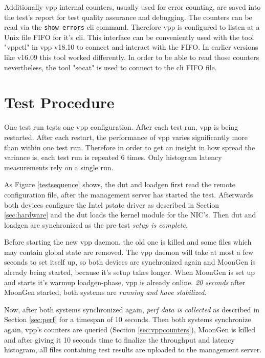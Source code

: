 Additionally \Ac{vpp} internal counters, usually used for error
counting, are saved into the test's report for test quality assurance
and debugging. The counters can be read via the \lstinline|show errors| 
\Ac{cli} command. Therefore \Ac{vpp} is configured to listen
at a Unix file FIFO for it's \Ac{cli}. This interface can be
conveniently used with the tool "vppctl" in \Ac{vpp} v18.10 to connect
and interact with the FIFO. In earlier versions like v16.09 this tool
worked differently. In order to be able to read those counters
nevertheless, the tool "socat" is used to connect to the \Ac{cli}
FIFO file.


\section{Test Procedure}

One test run tests one \Ac{vpp} configuration. After each test run,
\Ac{vpp} is being restarted. After each restart, the performance of
\Ac{vpp} varies significantly more than within one test run. Therefore
in order to get an insight in how spread the variance is, each test
run is repeated 6 times. Only histogram latency measurements rely on a
single run.

As Figure \ref{testsequence} shows, the \Ac{dut} and \Ac{loadgen}
first read the remote configuration file, after the management server
has started the test. Afterwards both devices configure the Intel
pstate driver  as described in Section \ref{sec:hardware} and the
\Ac{dut} loads the kernel module for the NIC's. Then \Ac{dut} and
\Ac{loadgen} are synchronized as the pre-test \textit{setup is
complete}.

Before starting the new \Ac{vpp} daemon, the old one is killed and
some files which may contain global state are removed. The \Ac{vpp}
daemon will take at most a few seconds to set itself up, so both
devices are synchronized again and MoonGen is already being started,
because it's setup takes longer. When MoonGen is set up and starts
it's warmup \Ac{loadgen}-phase, \Ac{vpp} is already online. \textit{20
seconds} after MoonGen started, both systems are \textit{running and
have stabilized}.

Now, after both systems synchronized again, \textit{\Ac{perf} data is
collected} as described in Section \ref{sec:perf} for a timespan of 10
seconds. Then both systems synchronize again, \Ac{vpp}'s counters are
queried (Section \ref{sec:vppcounters}), MoonGen is killed and after
giving it 10 seconds time to finalize the throughput and latency
histogram, all files containing test results are uploaded to the
management server.

